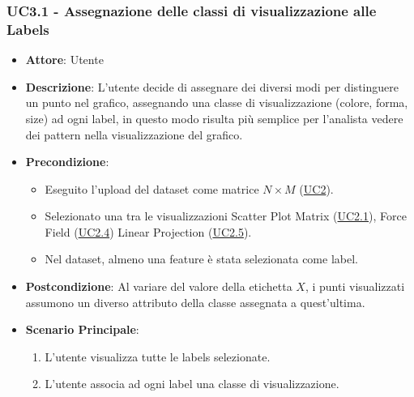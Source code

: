     \subsubsection{UC3.1 - Assegnazione delle classi di visualizzazione alle Labels}
    \label{uc3.1}
    \begin{itemize}
    \item \textbf{Attore}: Utente
    \item \textbf{Descrizione}: L'utente decide di assegnare dei diversi modi per distinguere un punto nel grafico, assegnando una classe di visualizzazione (colore, forma, size) ad ogni label, in questo modo risulta più semplice per l'analista vedere dei pattern nella visualizzazione del grafico.
    \item \textbf{Precondizione}:
    \begin{itemize}
        \item Eseguito l'upload del dataset come matrice $N\times M$ (\hyperref[uc2]{UC2}).
        \item Selezionato una tra le visualizzazioni Scatter Plot Matrix (\hyperref[uc2.1]{UC2.1}), Force Field (\hyperref[uc2.4]{UC2.4}) Linear Projection (\hyperref[uc2.5]{UC2.5}).
        \item Nel dataset, almeno una feature è stata selezionata come label.
    \end{itemize}
    \item \textbf{Postcondizione}: Al variare del valore della etichetta $X$, i punti visualizzati assumono un diverso attributo della classe assegnata a quest'ultima.
    \item \textbf{Scenario Principale}: 
    \begin{enumerate}
        \item L'utente visualizza tutte le labels selezionate.
        \item L'utente associa ad ogni label una classe di visualizzazione.
    \end{enumerate}  
    \end{itemize}